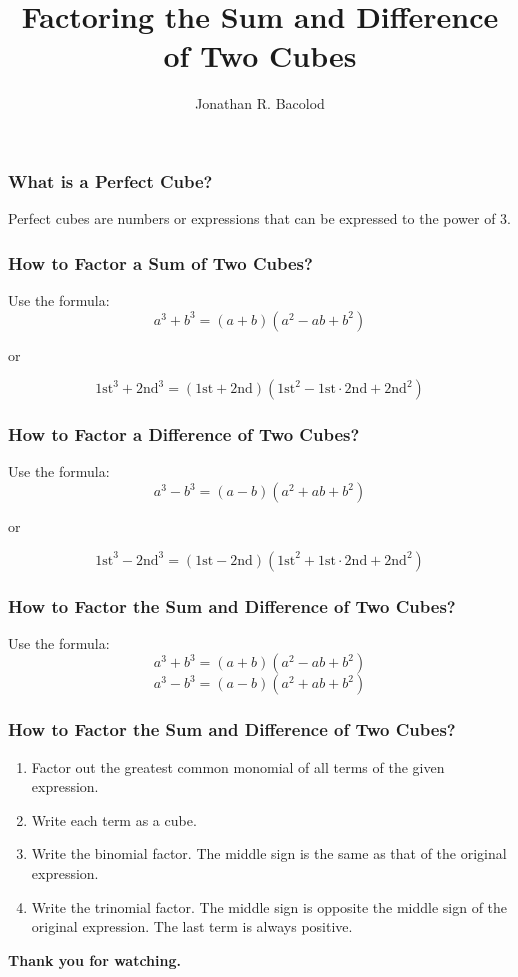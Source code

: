 \documentclass[14pt]{beamer}
\title[] {Factoring the Sum and Difference of Two Cubes}
\author{Jonathan R. Bacolod}
\institute[SHS]{Sauyo High School}
\date{}
\begin{document}
	\frame{\titlepage}
	
	\begin{frame}
		\frametitle{What is a Perfect Cube?}
		Perfect cubes are numbers or expressions that can be expressed to the power of 3.		
	\end{frame}

    \begin{frame}
    	\frametitle{How to Factor a Sum of Two Cubes?}
    	Use the formula:
    	\[ a^3 + b^3 = (a+b)(a^2 - ab + b^2) \]
    	
    	\begin{center}
    		or 
    	\end{center}
    	\[ \text{1st}^3 + \text{2nd}^3 = (\text{1st} + \text{2nd})(\text{1st}^2 - \text{1st}\cdot\text{2nd} + \text{2nd}^2) \]
    	
    \end{frame}
	
	\begin{frame}
		\frametitle{How to Factor a Difference of Two Cubes?}
		Use the formula:
		\[ a^3 - b^3 = (a-b)(a^2 + ab + b^2) \]
		
		\begin{center}
			or 
		\end{center}
		\[ \text{1st}^3 - \text{2nd}^3 = (\text{1st} - \text{2nd})(\text{1st}^2 + \text{1st}\cdot\text{2nd} + \text{2nd}^2) \]
		
	\end{frame}

    \begin{frame}
    	\frametitle{How to Factor the Sum and Difference of Two Cubes?}
    	Use the formula:
    	\[ a^3 + b^3 = (a+b)(a^2 - ab + b^2) \]
    	\[ a^3 - b^3 = (a-b)(a^2 + ab + b^2) \]
    	    	
    \end{frame}
	
    \begin{frame}
    	\frametitle{How to Factor the Sum and Difference of Two Cubes?}
    	\begin{enumerate}
    		\item<1-> Factor out the greatest common monomial of all terms of the given expression.
    		\item<2-> Write each term as a cube.
    		\item<3-> Write the binomial factor. The middle sign is the same as that of the original expression.
    		\item<4-> Write the trinomial factor. The middle sign is opposite the middle sign of the original expression. The last term is always positive.
    	\end{enumerate}
    \end{frame}

    \begin{frame}
    	\begin{center}
    		\textbf{\LARGE Thank you for watching.}
    	\end{center}
    \end{frame}
	
\end{document}
